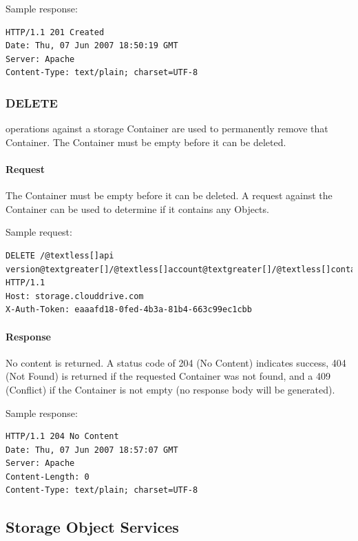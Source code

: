 \documentclass[letterpaper,10pt,english]{manual}
\begin{document}
Sample response:

\begin{Verbatim}[commandchars=@\[\]]
HTTP/1.1 201 Created
Date: Thu, 07 Jun 2007 18:50:19 GMT
Server: Apache
Content-Type: text/plain; charset=UTF-8
\end{Verbatim}


\subsubsection{DELETE}

 operations against a storage Container are used to permanently
remove that Container.  The Container must be empty before it can be
deleted.


\paragraph{Request}

The Container must be empty before it can be deleted.  A  request
against the Container can be used to determine if it contains any Objects.

Sample request:

\begin{Verbatim}[commandchars=@\[\]]
DELETE /@textless[]api version@textgreater[]/@textless[]account@textgreater[]/@textless[]container@textgreater[] HTTP/1.1
Host: storage.clouddrive.com
X-Auth-Token: eaaafd18-0fed-4b3a-81b4-663c99ec1cbb
\end{Verbatim}


\paragraph{Response}

No content is returned. A status code of 204 (No Content) indicates
success, 404 (Not Found) is returned if the requested Container was not
found, and a 409 (Conflict) if the Container is not empty (no response
body will be generated).

Sample response:

\begin{Verbatim}[commandchars=@\[\]]
HTTP/1.1 204 No Content
Date: Thu, 07 Jun 2007 18:57:07 GMT
Server: Apache
Content-Length: 0
Content-Type: text/plain; charset=UTF-8
\end{Verbatim}


\subsection{Storage Object Services}
\end{document}
